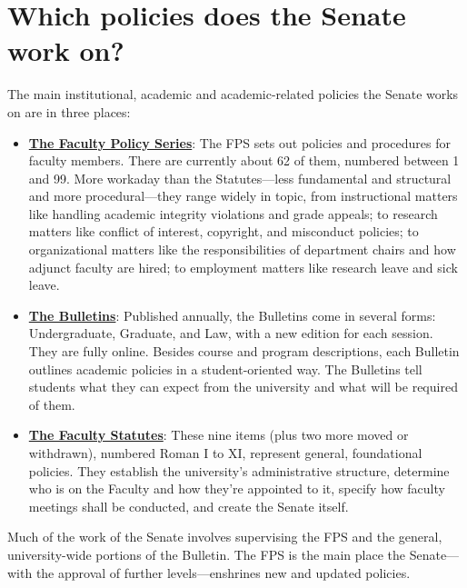 \documentclass[12pt]{article}
\providecommand{\tightlist}{}
\begin{document}
\section{Which policies does the Senate work
on?}\label{which-policies-does-the-senate-work-on}

The main institutional, academic and academic-related policies the
Senate works on are in three places:

\begin{itemize}
\tightlist
\item
  \textbf{\href{https://www.hofstra.edu/senate/faculty-policy-series.html}{The
  Faculty Policy Series}}: The FPS sets out policies and procedures for
  faculty members. There are currently about 62 of them, numbered
  between 1 and 99. More workaday than the Statutes---less fundamental
  and structural and more procedural---they range widely in topic, from
  instructional matters like handling academic integrity violations and
  grade appeals; to research matters like conflict of interest,
  copyright, and misconduct policies; to organizational matters like the
  responsibilities of department chairs and how adjunct faculty are
  hired; to employment matters like research leave and sick leave.
\item
  \textbf{\href{https://bulletin.hofstra.edu}{The Bulletins}}: Published
  annually, the Bulletins come in several forms: Undergraduate,
  Graduate, and Law, with a new edition for each session. They are fully
  online. Besides course and program descriptions, each Bulletin
  outlines academic policies in a student-oriented way. The Bulletins
  tell students what they can expect from the university and what will
  be required of them.
\item
  \textbf{\href{https://www.hofstra.edu/sites/default/files/2024-04/facultystatutes.pdf}{The
  Faculty Statutes}}: These nine items (plus two more moved or
  withdrawn), numbered Roman I to XI, represent general, foundational
  policies. They establish the university's administrative structure,
  determine who is on the Faculty and how they're appointed to it,
  specify how faculty meetings shall be conducted, and create the Senate
  itself.
\end{itemize}

Much of the work of the Senate involves supervising the FPS and the
general, university-wide portions of the Bulletin. The FPS is the main
place the Senate---with the approval of further levels---enshrines new
and updated policies.
\end{document}
